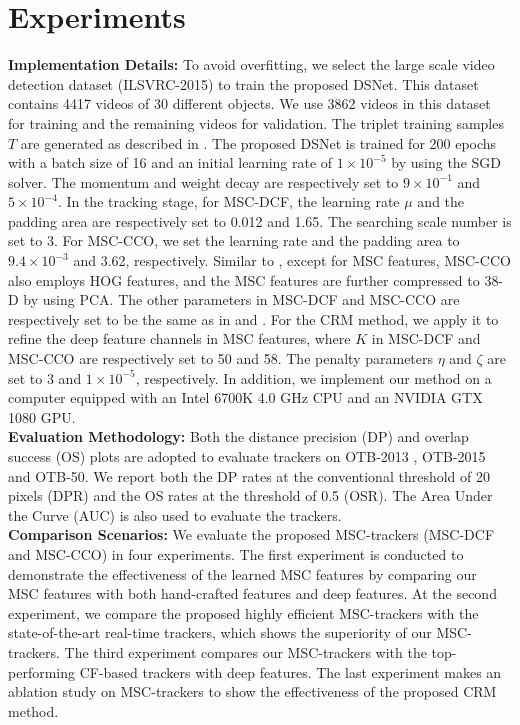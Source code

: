 \documentclass[runningheads]{llncs}
\begin{document}
\section{Experiments}

\textbf{Implementation Details:} To avoid overfitting, we select the large scale video detection dataset (ILSVRC-2015) \cite{ILSVRC} to train the proposed DSNet. This dataset contains 4417 videos of 30 different objects. We use 3862 videos in this dataset for training and the remaining videos for validation. The triplet training samples $T$ are generated as described in \cite{CFCF}. The proposed DSNet is trained for 200 epochs with a batch size of 16 and an initial learning rate of $1\times 10^{-5}$ by using the SGD solver. The momentum and weight decay are respectively set to $9\times 10^{-1}$ and $5\times10^{-4}$. In the tracking stage, for MSC-DCF, the learning rate $\mu$ and the padding area are respectively set to 0.012 and 1.65. The searching scale number is set to 3. For MSC-CCO, we set the learning rate and the padding area to $ 9.4\times 10^{-3}$ and 3.62, respectively. Similar to \cite{ECO}, except for MSC features, MSC-CCO also employs HOG features, and the MSC features are further compressed to 38-D by using PCA. The other parameters in MSC-DCF and MSC-CCO are respectively set to be the same as in \cite{DCFNet} and \cite{ECO}. For the CRM method, we apply it to refine the deep feature channels in MSC features, where $K$ in MSC-DCF and MSC-CCO are respectively set to 50 and 58. The penalty parameters $\eta$ and $\zeta$ are set to 3 and $1\times10^{-5}$, respectively. In addition, we implement our method on a computer equipped with an Intel 6700K 4.0 GHz CPU and an NVIDIA GTX 1080 GPU. \\



\noindent \textbf{Evaluation Methodology:} Both the distance precision (DP) and overlap success (OS) plots are adopted to evaluate trackers on OTB-2013 \cite{OTB50}, OTB-2015 \cite{OTB100} and OTB-50. We report both the DP rates at the conventional threshold of 20 pixels (DPR) and the OS rates at the threshold of 0.5 (OSR). The Area Under the Curve (AUC) is also used to evaluate the trackers. \\

\noindent \textbf{Comparison Scenarios:} We evaluate the proposed MSC-trackers (MSC-DCF and MSC-CCO) in four experiments. The first experiment is conducted to demonstrate the effectiveness of the learned MSC features by comparing our MSC features with both hand-crafted features and deep features.  At the second experiment, we compare the proposed highly efficient MSC-trackers with the state-of-the-art real-time trackers, which shows the superiority of our MSC-trackers. The third experiment compares our MSC-trackers with the top-performing CF-based trackers with deep features. The last experiment makes an ablation study on MSC-trackers to show the effectiveness of the proposed CRM method.
\end{document}
